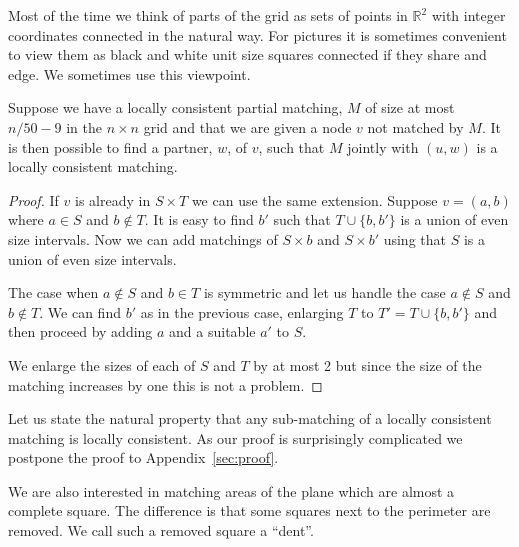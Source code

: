 \documentclass{article}\usepackage[a4paper,margin=20mm]{geometry}
\makeatletter
\newcommand\IfRestateTF{%
  \ifx\label\thmt@gobble@label %
    \expandafter\@firstoftwo
  \else
    \expandafter\@secondoftwo
  \fi
}
\newcommand{\RestateRemark}{\IfRestateTF{{\normalfont\bfseries (Restated) }}{}}
\makeatother
\begin{document}
Most of the time we think of parts of the grid as sets of
points in $\mathbb R^2$ with integer coordinates connected
in the natural way.  For pictures it is sometimes convenient
to view them as black and white unit size squares connected
if they share and edge.  We sometimes use this viewpoint.

\begin{lemma}\label{lemma:cons}
Suppose we have a locally consistent partial matching, $M$ of size at
most $n/50-9$ in the $n \times n$ grid and that we are given
a node $v$ not matched
by $M$.  It is then possible to find a partner, $w$, of $v$, 
such that $M$ jointly with $(u,w)$ is a locally
consistent matching.
\end{lemma}

\begin{proof}
If $v$ is already in $S \times T$ we can use the same extension.
Suppose $v=(a,b)$ where $a \in S$ and $b \not\in T$.
It is easy to find $b'$ such that $T \cup \{ b, b'\}$
is a union of even size intervals.  Now we can add matchings
of $S \times b$ and $S \times b'$ using that $S$ is a union
of even size intervals.

The case when $a \not\in S$ and $b \in T$ is symmetric
and let us handle the case $a \not \in S$ and $b \not\in T$.
We can find $b'$ as in the previous case, enlarging $T$
to $T'= T \cup \{ b, b'\}$ and then proceed by
adding $a$ and a suitable $a'$ to $S$.

We enlarge the sizes of each of $S$ and $T$ by at most 2 but since
the size of the matching increases by one this is not a problem.
\end{proof}

Let us state the natural property that
any sub-matching of a locally consistent matching is
locally consistent.  As our proof is surprisingly
complicated we postpone the proof to Appendix~\ref{sec:proof}.


We are also interested in matching areas of the plane
which are almost a complete square.  The difference
is that some squares next to the perimeter are
removed.  We call such a removed square a ``dent''.
\end{document}
